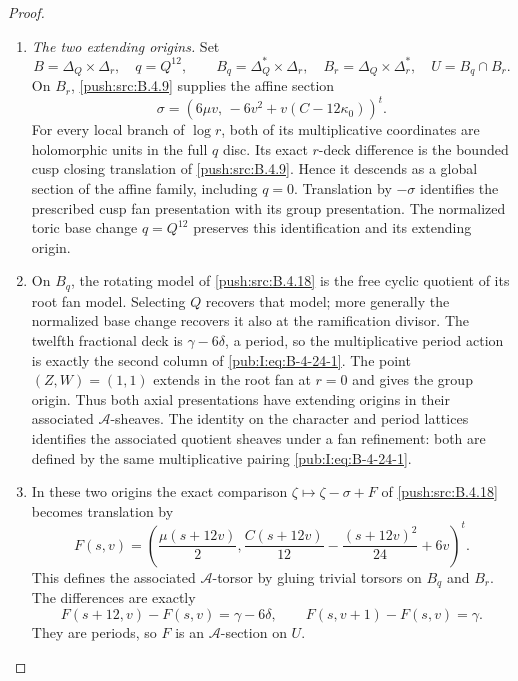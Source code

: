 \begin{proof}
\begin{enumerate}[label=\arabic*.,leftmargin=*]
\item \emph{The two extending origins.}
Set
\[
 B=\Delta_Q\times\Delta_r,\quad q=Q^{12},\qquad
 B_q=\Delta_Q^*\times\Delta_r,\quad
 B_r=\Delta_Q\times\Delta_r^*,\quad U=B_q\cap B_r.
\]
On $B_r$, \ref{push:src:B.4.9} supplies the affine section
\begin{equation}
 \sigma=
 \left(6\mu v,\,-6v^2+v(C-12\kappa_0)\right)^t.
\label{pub:I:eq:B-4-24-2}
\end{equation}
For every local branch of $\log r$, both of its
multiplicative coordinates are holomorphic units
in the full $q$ disc. Its exact $r$-deck difference
is the bounded cusp closing translation
of \ref{push:src:B.4.9}. Hence it descends as a global section
of the affine family, including $q=0$.
Translation by $-\sigma$ identifies the prescribed
cusp fan presentation with its group presentation.
The normalized toric base change $q=Q^{12}$ preserves
this identification and its extending origin.

\item On $B_q$, the rotating model of \ref{push:src:B.4.18} is the
free cyclic quotient of its root fan model. Selecting
$Q$ recovers that model; more generally the normalized
base change recovers it also at the ramification
divisor. The twelfth fractional deck is
$\gamma-6\delta$, a period, so the
multiplicative period action is exactly the second
column of \eqref{pub:I:eq:B-4-24-1}. The point $(Z,W)=(1,1)$
extends in the root fan at $r=0$ and gives the
group origin. Thus both axial presentations have
extending origins in their associated
$\mathcal A$-sheaves. The identity on the character and period lattices identifies the associated quotient sheaves under a fan refinement: both are defined by the same multiplicative pairing \eqref{pub:I:eq:B-4-24-1}.

\item In these two origins the exact comparison
$\zeta\mapsto\zeta-\sigma+F$ of \ref{push:src:B.4.18} becomes
translation by
\begin{equation}
 F(s,v)=\left(
 \frac{\mu(s+12v)}2,
 \frac{C(s+12v)}{12}-\frac{(s+12v)^2}{24}+6v
 \right)^t.
\label{pub:I:eq:B-4-24-3}
\end{equation}
This defines the associated $\mathcal A$-torsor
by gluing trivial torsors on $B_q$ and $B_r$.
The differences are exactly
\begin{equation}
 F(s+12,v)-F(s,v)=\gamma-6\delta,
 \qquad F(s,v+1)-F(s,v)=\gamma.
\label{pub:I:eq:B-4-24-4}
\end{equation}
They are periods, so $F$ is an $\mathcal A$-section
on $U$.


\end{enumerate}
\end{proof}
